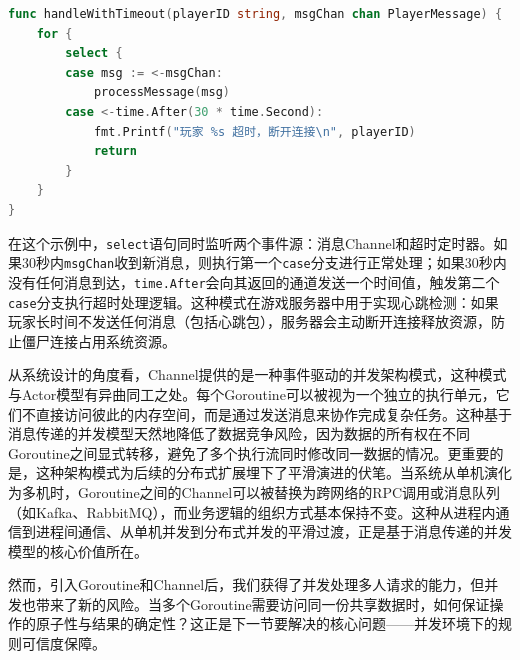 \begin{tcolorbox}[title=使用Select实现超时控制]
\begin{lstlisting}[style=codeblock, language=go]
func handleWithTimeout(playerID string, msgChan chan PlayerMessage) {
    for {
        select {
        case msg := <-msgChan:
            processMessage(msg)
        case <-time.After(30 * time.Second):
            fmt.Printf("玩家 %s 超时，断开连接\n", playerID)
            return
        }
    }
}
\end{lstlisting}
\end{tcolorbox}

在这个示例中，\texttt{select}语句同时监听两个事件源：消息Channel和超时定时器。如果30秒内\texttt{msgChan}收到新消息，则执行第一个\texttt{case}分支进行正常处理；如果30秒内没有任何消息到达，\texttt{time.After}会向其返回的通道发送一个时间值，触发第二个\texttt{case}分支执行超时处理逻辑。这种模式在游戏服务器中用于实现心跳检测：如果玩家长时间不发送任何消息（包括心跳包），服务器会主动断开连接释放资源，防止僵尸连接占用系统资源。

从系统设计的角度看，Channel提供的是一种事件驱动的并发架构模式，这种模式与Actor模型有异曲同工之处。每个Goroutine可以被视为一个独立的执行单元，它们不直接访问彼此的内存空间，而是通过发送消息来协作完成复杂任务。这种基于消息传递的并发模型天然地降低了数据竞争风险，因为数据的所有权在不同Goroutine之间显式转移，避免了多个执行流同时修改同一数据的情况。更重要的是，这种架构模式为后续的分布式扩展埋下了平滑演进的伏笔。当系统从单机演化为多机时，Goroutine之间的Channel可以被替换为跨网络的RPC调用或消息队列（如Kafka、RabbitMQ），而业务逻辑的组织方式基本保持不变。这种从进程内通信到进程间通信、从单机并发到分布式并发的平滑过渡，正是基于消息传递的并发模型的核心价值所在。

然而，引入Goroutine和Channel后，我们获得了并发处理多人请求的能力，但并发也带来了新的风险。当多个Goroutine需要访问同一份共享数据时，如何保证操作的原子性与结果的确定性？这正是下一节要解决的核心问题——并发环境下的规则可信度保障。


